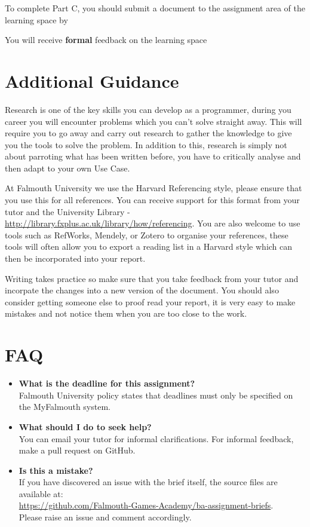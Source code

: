 \documentclass{../fal_assignment}
\begin{document}
To complete Part C, you should submit a document to the assignment area of the learning space by 

You will receive \textbf{formal} feedback on the learning space

\section*{Additional Guidance}
Research is one of the key skills you can develop as a programmer, during you career you will encounter problems which you can't solve straight away. This will require you to go away and carry out research to gather the knowledge to give you the tools to solve the problem. In addition to this, research is simply not about parroting what has been written before, you have to critically analyse and then adapt to your own Use Case.

At Falmouth University we use the Harvard Referencing style, please ensure that you use this  for all references. You can receive support for this format from your tutor and the University Library - \url{http://library.fxplus.ac.uk/library/how/referencing}. You are also welcome to use tools such as RefWorks, Mendely, or Zotero to organise your references, these tools will often allow you to export a reading list in a Harvard style which can then be incorporated into your report.

Writing takes practice so make sure that you take feedback from your tutor and incorpate the changes into a new version of the document. You should also consider getting someone else to proof read your report, it is very easy to make mistakes and not notice them when you are too close to the work.

\section*{FAQ}

\begin{itemize}
	\item 	\textbf{What is the deadline for this assignment?} \\ 
    		Falmouth University policy states that deadlines must only be specified on the MyFalmouth system.
    		
	\item 	\textbf{What should I do to seek help?} \\ 
    		You can email your tutor for informal clarifications. For informal feedback, make a pull request on GitHub. 
    		
    	\item 	\textbf{Is this a mistake?} \\ 	
    		If you have discovered an issue with the brief itself, the source files are available at: \\
    		\url{https://github.com/Falmouth-Games-Academy/ba-assignment-briefs}.\\
    		 Please raise an issue and comment accordingly.
\end{itemize}
\end{document}
